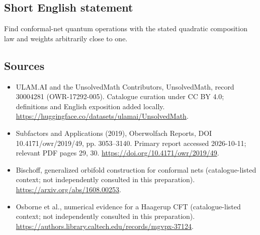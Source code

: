 \documentclass[11pt]{article}
\begin{document}
\subsection{Short English statement}
Find conformal-net quantum operations with the stated quadratic composition law and weights arbitrarily close to one.
\subsection{Sources}
\begin{itemize}
\item[\hypertarget{source:30004281:1}{S1}] ULAM.AI and the UnsolvedMath Contributors, UnsolvedMath, record 30004281 (OWR-17292-005). Catalogue curation under CC BY 4.0; definitions and English exposition added locally.
\url{https://huggingface.co/datasets/ulamai/UnsolvedMath}.
\item[\hypertarget{source:30004281:2}{S2}] Subfactors and Applications (2019), Oberwolfach Reports, DOI 10.4171/owr/2019/49, pp. 3053--3140. Primary report accessed 2026-10-11; relevant PDF pages 29, 30.
\url{https://doi.org/10.4171/owr/2019/49}.
\item[\hypertarget{source:30004281:3}{S3}] Bischoff, generalized orbifold construction for conformal nets (catalogue-listed context; not independently consulted in this preparation).
\url{https://arxiv.org/abs/1608.00253}.
\item[\hypertarget{source:30004281:4}{S4}] Osborne et al., numerical evidence for a Haagerup CFT (catalogue-listed context; not independently consulted in this preparation).
\url{https://authors.library.caltech.edu/records/mgvpx-37124}.
\end{itemize}
\label{end:30004281}
\end{document}
